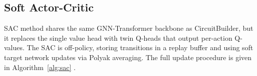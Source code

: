 \documentclass{article} %
\begin{document}


\subsection{Soft Actor-Critic}

SAC method shares the same GNN-Transformer backbone as CircuitBuilder, but it replaces the single value head with twin Q-heads that output per-action Q-values. The SAC is off-policy, storing transitions in a replay buffer and using soft target network updates via Polyak averaging. The full update procedure is given in Algorithm~\ref{alg:sac} \citep{OpenAISAC}.
\end{document}
